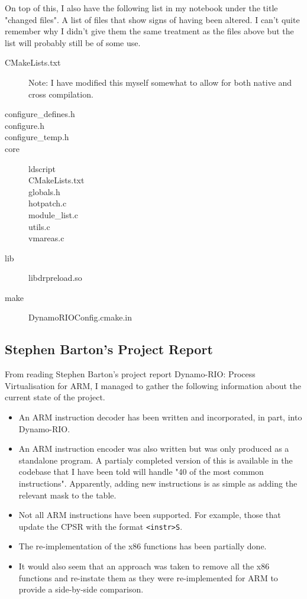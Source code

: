 \documentclass[a4paper]{article}
\begin{document}
On top of this, I also have the following list in my notebook under the title
"changed files". A list of files that show signs of having been altered. I can't
quite remember why I didn't give them the same treatment as the files above but
the list will probably still be of some use.
\begin{description}
\item[CMakeLists.txt] Note: I have modified this myself somewhat to allow for
both native and cross compilation.
\item[configure\_defines.h]
\item[configure.h]
\item[configure\_temp.h]
\item[core]
 \begin{description}
 \item[ldscript]
 \item[CMakeLists.txt]
 \item[globals.h]
 \item[hotpatch.c]
 \item[module\_list.c]
 \item[utils.c]
 \item[vmareas.c]
 \end{description}
\item[lib]
 \begin{description}
 \item[libdrpreload.so]
 \end{description}
\item[make]
 \begin{description}
 \item[DynamoRIOConfig.cmake.in]
 \end{description}
\end{description}

\subsection{Stephen Barton's Project Report}
From reading Stephen Barton's project report Dynamo-RIO: Process Virtualisation
for ARM, I managed to gather the following information about the current state
of the project.
\begin{itemize}
\item An ARM instruction decoder has been written and incorporated, in part,
into Dynamo-RIO.
\item An ARM instruction encoder was also written but was only produced as a
standalone program. A partialy completed version of this is available in the
codebase that I have been told will handle "40 of the most common instructions".
Apparently, adding new instructions is as simple as adding the relevant mask to
the table.
\item Not all ARM instructions have been supported. For example, those that
update the CPSR with the format \texttt{<instr>S}.
\item The re-implementation of the x86 functions has been partially done.
\item It would also seem that an approach was taken to remove all the x86
functions and re-instate them as they were re-implemented for ARM to provide a
side-by-side comparison.
\end{itemize}
\end{document}
